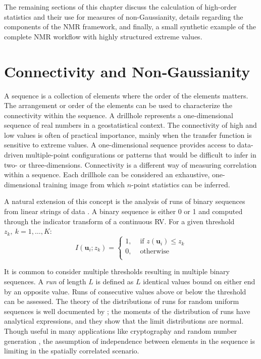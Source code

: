 The remaining sections of this chapter discuss the calculation of high-order statistics and their use for measures of non-Gaussianity, details regarding the components of the \gls{NMR} framework, and finally, a small synthetic example of the complete \gls{NMR} workflow with highly structured extreme values.


\FloatBarrier
\section{Connectivity and Non‐Gaussianity}
\label{sec:03connect}

A sequence is a collection of elements where the order of the elements matters. The arrangement or order of the elements can be used to characterize the connectivity within the sequence. A drillhole represents a one-dimensional sequence of real numbers in a geostatistical context. The connectivity of high and low values is often of practical importance, mainly when the transfer function is sensitive to extreme values. A one-dimensional sequence provides access to data-driven multiple-point configurations or patterns that would be difficult to infer in two- or three-dimensions. Connectivity is a different way of measuring correlation within a sequence. Each drillhole can be considered an exhaustive, one-dimensional training image from which $n\text{-point}$ statistics can be inferred.

A natural extension of this concept is the analysis of runs of binary sequences from linear strings of data \citep{ortiz2003characterization}. A binary sequence is either 0 or 1 and computed through the indicator transform of a continuous \gls{RV}. For a given threshold $z_{k}, \ k=1,\dots,K$:
\begin{equation}
    I(\mathbf{u}_{i};z_{k}) =
    \begin{cases}
        1, & \text{ if }z(\mathbf{u}_{i}) \leq z_{k} \\
        0, & \text{ otherwise }                      \\
    \end{cases}
    \label{eq:indicator}
\end{equation}

It is common to consider multiple thresholds resulting in multiple binary sequences. A \textit{run} of length $L$ is defined as $L$ identical values bound on either end by an opposite value. Runs of consecutive values above or below the threshold can be assessed. The theory of the distributions of runs for random uniform sequences is well documented by \cite{fu2003distribution}; the moments of the distribution of runs have analytical expressions, and they show that the limit distributions are normal. Though useful in many applications like cryptography and random number generation \citep{rukhin2010statistical}, the assumption of independence between elements in the sequence is limiting in the spatially correlated scenario.

